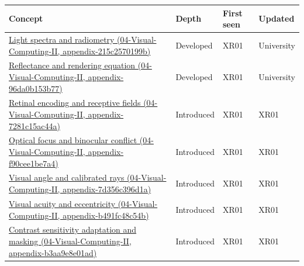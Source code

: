 {\def\LTcaptype{none} %
\begin{longtable}[]{@{}
  >{\raggedright\arraybackslash}p{}
  >{\raggedright\arraybackslash}p{}
  >{\raggedright\arraybackslash}p{}
  >{\raggedright\arraybackslash}p{}@{}}
\toprule\noalign{}
\begin{minipage}[b]{\linewidth}\raggedright
Concept
\end{minipage} & \begin{minipage}[b]{\linewidth}\raggedright
Depth
\end{minipage} & \begin{minipage}[b]{\linewidth}\raggedright
First seen
\end{minipage} & \begin{minipage}[b]{\linewidth}\raggedright
Updated
\end{minipage} \\
\midrule\noalign{}
\endhead
\bottomrule\noalign{}
\endlastfoot
\href{../04-Visual-Computing-II/main.pdf\#nameddest=appendix-215c2570199b}{Light spectra and radiometry (04-Visual-Computing-II, appendix-215c2570199b)} & Developed & XR01 & University \\
\href{../04-Visual-Computing-II/main.pdf\#nameddest=appendix-96da0b153b77}{Reflectance and rendering equation (04-Visual-Computing-II, appendix-96da0b153b77)} & Developed & XR01 & University \\
\href{../04-Visual-Computing-II/main.pdf\#nameddest=appendix-7281c15ac44a}{Retinal encoding and receptive fields (04-Visual-Computing-II, appendix-7281c15ac44a)} & Introduced & XR01 & XR01 \\
\href{../04-Visual-Computing-II/main.pdf\#nameddest=appendix-f90cee1be7a4}{Optical focus and binocular conflict (04-Visual-Computing-II, appendix-f90cee1be7a4)} & Introduced & XR01 & XR01 \\
\href{../04-Visual-Computing-II/main.pdf\#nameddest=appendix-7d356c396d1a}{Visual angle and calibrated rays (04-Visual-Computing-II, appendix-7d356c396d1a)} & Introduced & XR01 & XR01 \\
\href{../04-Visual-Computing-II/main.pdf\#nameddest=appendix-b491fc48c54b}{Visual acuity and eccentricity (04-Visual-Computing-II, appendix-b491fc48c54b)} & Introduced & XR01 & XR01 \\
\href{../04-Visual-Computing-II/main.pdf\#nameddest=appendix-b3aa9e8e01ad}{Contrast sensitivity adaptation and masking (04-Visual-Computing-II, appendix-b3aa9e8e01ad)} & Introduced & XR01 & XR01 \\

\end{longtable}}
